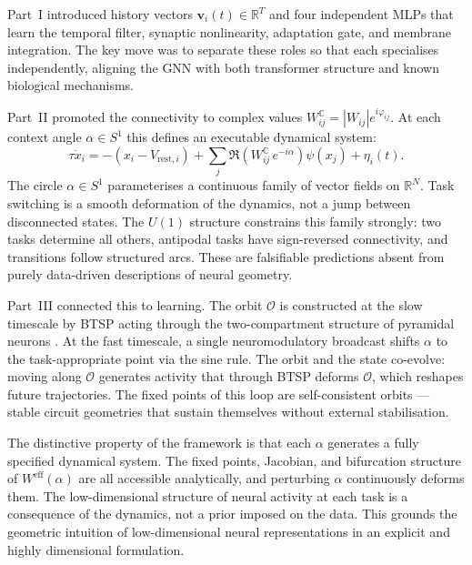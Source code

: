 \documentclass[11pt]{article}
\begin{document}
Part~I introduced history vectors $\mathbf{v}_i(t) \in \mathbb{R}^T$
and four independent MLPs that learn the temporal filter, synaptic
nonlinearity, adaptation gate, and membrane integration. The key
move was to separate these roles so that each specialises
independently, aligning the GNN with both transformer structure and
known biological mechanisms.

Part~II promoted the connectivity to complex values
$W_{ij}^{\mathbb{C}} = |W_{ij}|e^{i\varphi_{ij}}$. At each context
angle $\alpha \in S^1$ this defines an executable dynamical system:
\begin{equation}
\tau\dot{x}_i = -(x_i - V_{\text{rest},i}) +
\sum_j \Re\!\left(W_{ij}^{\mathbb{C}}\, e^{-i\alpha}\right)\psi(x_j)
+ \eta_i(t).
\end{equation}
The circle $\alpha \in S^1$ parameterises a continuous family of
vector fields on $\mathbb{R}^N$. Task switching is a smooth
deformation of the dynamics, not a jump between disconnected
states. The $U(1)$ structure constrains this family strongly:
two tasks determine all others, antipodal tasks have sign-reversed
connectivity, and transitions follow structured arcs. These are
falsifiable predictions absent from purely data-driven descriptions
of neural geometry.

Part~III connected this to learning. The orbit $\mathcal{O}$
is constructed at the slow timescale by BTSP acting through the
two-compartment structure of pyramidal neurons \citep{magee2026}.
At the fast timescale, a single neuromodulatory broadcast shifts
$\alpha$ to the task-appropriate point via the sine rule. The orbit
and the state co-evolve: moving along $\mathcal{O}$ generates
activity that through BTSP deforms $\mathcal{O}$, which reshapes
future trajectories. The fixed points of this loop are
self-consistent orbits --- stable circuit geometries that sustain
themselves without external stabilisation.

The distinctive property of the framework is that each $\alpha$
generates a fully specified dynamical system. The fixed points,
Jacobian, and bifurcation structure of $W^{\text{eff}}(\alpha)$
are all accessible analytically, and perturbing $\alpha$ 
continuously deforms them. The low-dimensional structure of neural
activity at each task is a consequence of the dynamics, not a
prior imposed on the data. This grounds the geometric intuition of low-dimensional neural representations in an explicit and highly dimensional formulation.
\end{document}
